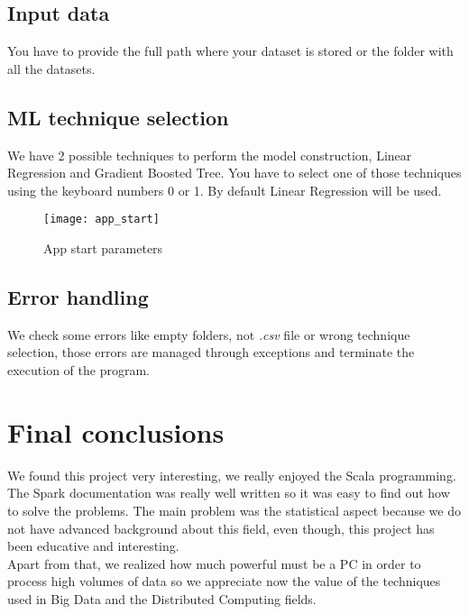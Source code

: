 \subsection{Input data}

You have to provide the full path where your dataset is stored or the folder with all the datasets.

\subsection{ML technique selection}

We have 2 possible techniques to perform the model construction, Linear Regression and Gradient Boosted Tree. You have to select one of those techniques using the keyboard numbers 0 or 1. By default Linear Regression will be used.

\begin{figure}[H]
	\centering
	\texttt{[image: app\_start]}
	\caption{App start parameters}
\end{figure}

\subsection{Error handling}

We check some errors like empty folders, not \textit{.csv} file or wrong technique selection, those errors are managed through exceptions and terminate the execution of the program.

\section{Final conclusions}

We found this project very interesting, we really enjoyed the Scala programming. The Spark documentation was really well written so it was easy to find out how to solve the problems. The main problem was the statistical aspect because we do not have advanced background about this field, even though, this project has been educative and interesting.\\

Apart from that, we realized how much powerful must be a PC in order to process high volumes of data so we appreciate now the value of the techniques used in Big Data and the Distributed Computing fields.

